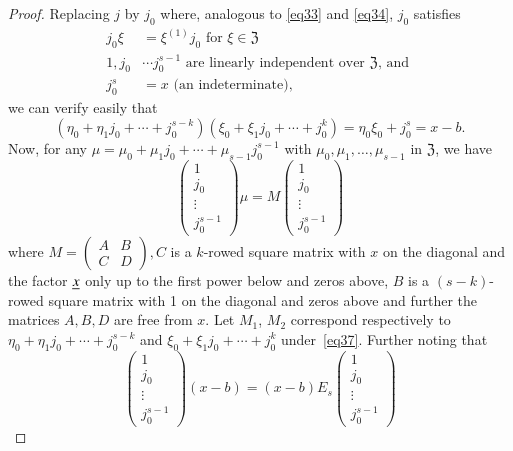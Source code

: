 \begin{proof}
Replacing $j$ by $j_0$ where, analogous to \eqref{eq33} and \eqref{eq34}, $j_0$
satisfies
\begin{align*}
j_0 \xi & = \xi^{(1)} j_0 \text{ for } \xi \in \mathfrak{Z}\\
1, j_0 & \cdots j^{s-1}_0 \text{ are linearly independent over
  $\mathfrak{Z}$, and }\\
j^s_0 & = x \text{ (an indeterminate)},
\end{align*}
we \pageoriginale can verify easily that
\begin{equation*}
(\eta_0 + \eta_1 j_0 + \cdots + j^{s-k}_0) (\xi_0 + \xi_1 j_0 + \cdots
  + j^k_0) = \eta_0 \xi_0 + j^s_0 = x-b. \tag{36}\label{eq36}
\end{equation*}
Now, for any $\mu = \mu_0+\mu_1 j_0+\cdots + \mu_{s-1} j^{s-1}_0$ with
$\mu_0, \mu_1,\ldots, \mu_{s-1}$ in $\mathfrak{Z}$, we have
\begin{equation*}
\left(\begin{smallmatrix}1
  \\ j_0\\ \vdots\\ j^{s-1}_0\end{smallmatrix}\right) \mu = M 
\left(\begin{smallmatrix}1
  \\ j_0\\ \vdots\\ j^{s-1}_0\end{smallmatrix}\right) \tag{37}\label{eq37}
 \end{equation*}
where $M =
\left(\begin{smallmatrix} A & B\\C & D \end{smallmatrix}\right), C$
is a $k$-rowed square matrix with $x$ on the diagonal and the factor
$\underline{x}$ only up to the first power below and zeros above, $B$ is a
$(s-k)$-rowed square matrix with 1 on the diagonal and zeros above
and further the matrices $A,B,D$ are free from $x$. Let $M_1$, $M_2$
correspond respectively to $\eta_0 + \eta_1 j_0 + \cdots + j^{s-k}_0$
and $\xi_0 + \xi_1 j_0 + \cdots + j^k_0$ under~\eqref{eq37}. Further noting
that 
$$
\left(\begin{smallmatrix} 1 \\ j_0
  \\\vdots\\ j^{s-1}_0\end{smallmatrix}\right) (x-b) = (x-b) E_s
\left(\begin{smallmatrix} 1
  \\ j_0\\ \vdots\\j^{s-1}_0\end{smallmatrix}\right) 
$$
\end{proof}
